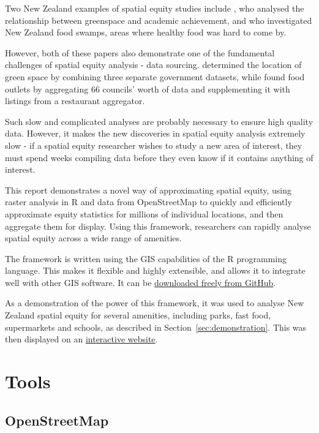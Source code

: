 \documentclass[12pt,a4paper]{article}
\begin{document}
Two New Zealand examples of spatial equity studies include \cite{beere:2017}, who analysed the relationship between greenspace and academic achievement, and \cite{sushil:2017} who investigated New Zealand food swamps, areas where healthy food was hard to come by. 

However, both of these papers also demonstrate one of the fundamental challenges of spatial equity analysis - data sourcing. \citeauthor{beere:2017} determined the location of green space by combining three separate government datasets, while \citeauthor{sushil:2017} found food outlets by aggregating 66 councils' worth of data and supplementing it with listings from a restaurant aggregator.

Such slow and complicated analyses are probably necessary to ensure high quality data. However, it makes the new discoveries in spatial equity analysis extremely slow - if a spatial equity researcher wishes to study a new area of interest, they must spend weeks compiling data before they even know if it contains anything of interest.

This report demonstrates a novel way of approximating spatial equity, using raster analysis in R and data from OpenStreetMap to quickly and efficiently approximate equity statistics for millions of individual locations, and then aggregate them for display. Using this framework, researchers can rapidly analyse spatial equity across a wide range of amenities.

The framework is written using the GIS capabilities of the R programming language. This makes it flexible and highly extensible, and allows it to integrate well with other GIS software. It can be \href{https://github.com/Scienciser/spatialequityproject}{downloaded freely from GitHub}.

As a demonstration of the power of this framework, it was used to analyse New Zealand spatial equity for several amenities, including parks, fast food, supermarkets and schools, as described in Section~\ref{sec:demonstration}. This was then displayed on an \href{https://www.arcgis.com/apps/dashboards/2e46471d956347bcb0a1de8465ad31d7}{interactive website}.


\section{Tools}
\label{sec:tools}

\subsection{OpenStreetMap}
\label{sec:osm}
\end{document}
